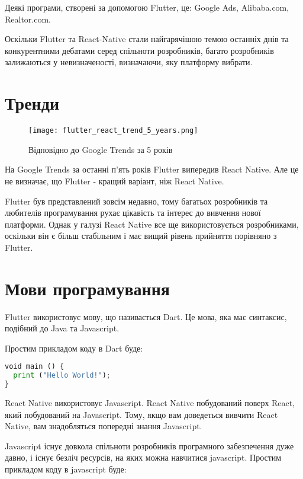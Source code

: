 Деякі програми, створені за допомогою Flutter, це: Google Ads, Alibaba.com, Realtor.com.

Оскільки Flutter та React-Native стали найгарячішою темою останніх днів та конкурентними дебатами серед спільноти розробників, багато розробників залижаються у невизначеності, визначаючи, яку платформу вибрати.

\section{Тренди}\label{section.1.3}

\begin{figure}
    \label{fig:flutter_react_trend_5_years}
    \texttt{[image: flutter\_react\_trend\_5\_years.png]}

    Відповідно до Google Trends за 5 років
\end{figure}

На Google Trends за останні п’ять років Flutter випередив React Native.
Але це не визначає, що Flutter - кращий варіант, ніж React Native.

Flutter був представлений зовсім недавно, тому багатьох розробників та любителів програмування рухає цікавість та інтерес до вивчення нової платформи.
Однак у галузі React Native все ще використовується розробниками, оскільки він є більш стабільним і має вищий рівень прийняття порівняно з Flutter.

\section{Мови програмування}\label{section.1.4}

Flutter використовує мову, що називається Dart. 
Це мова, яка має синтаксис, подібний до Java та Javascript.

Простим прикладом коду в Dart буде:
\begin{lstlisting}[style=light, language=Python,label={lst:vectorimg},caption=Dart Hello World]
void main () { 
  print ("Hello World!"); 
}
\end{lstlisting}

React Native використовує Javascript.
React Native побудований поверх React, який побудований на Javascript.
Тому, якщо вам доведеться вивчити React Native, вам знадобляться попередні знання Javascript.

Javascript існує довкола спільноти розробників програмного забезпечення дуже давно, і існує безліч ресурсів, на яких можна навчитися javascript.
Простим прикладом коду в javascript буде:

